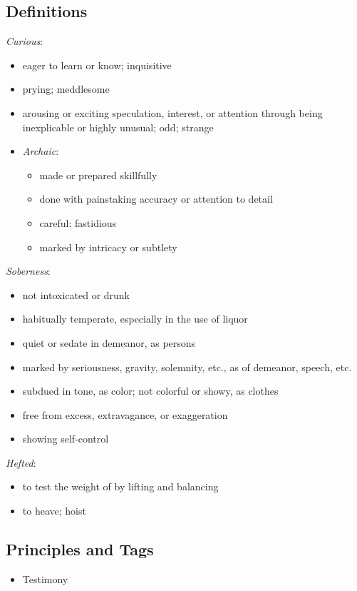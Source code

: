 \documentclass[12pt]{report}
\begin{document}
\subsection{Definitions\label{8witness:DFN}}
\emph{Curious}: \begin{itemize}
\item eager to learn or know; inquisitive
\item prying; meddlesome
\item arousing or exciting speculation, interest, or attention through being inexplicable or highly unusual; odd; strange
\item \emph{Archaic}:
\begin{itemize}
\item made or prepared skillfully
\item done with painstaking accuracy or attention to detail
\item careful; fastidious
\item marked by intricacy or subtlety
\end{itemize}
\end{itemize}
\emph{Soberness}: \begin{itemize}
\item not intoxicated or drunk
\item habitually temperate, especially in the use of liquor
\item quiet or sedate in demeanor, as persons
\item marked by seriousness, gravity, solemnity, etc., as of demeanor, speech, etc.
\item subdued in tone, as color; not colorful or showy, as clothes
\item free from excess, extravagance, or exaggeration
\item showing self-control
\end{itemize}
\emph{Hefted}: \begin{itemize}
\item to test the weight of by lifting and balancing
\item to heave; hoist
\end{itemize}
\subsection{Principles and Tags\label{8witness:principles}}
\begin{itemize}
\item {}Testimony
\end{itemize}
\end{document}
